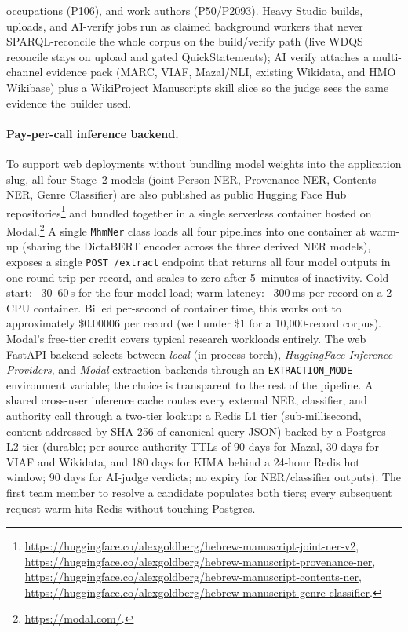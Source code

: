 \documentclass[Afour,sageh,times]{sagej}
\begin{document}
occupations (P106), and work authors (P50/P2093). Heavy Studio builds, uploads, and AI-verify jobs run as claimed background workers that never SPARQL-reconcile the whole corpus on the build/verify path (live WDQS reconcile stays on upload and gated QuickStatements); AI verify attaches a multi-channel evidence pack (MARC, VIAF, Mazal/NLI, existing Wikidata, and HMO Wikibase) plus a WikiProject Manuscripts skill slice so the judge sees the same evidence the builder used.

\paragraph{Pay-per-call inference backend.} To support web deployments without bundling model weights into the application slug, all four Stage~2 models (joint Person NER, Provenance NER, Contents NER, Genre Classifier) are also published as public Hugging Face Hub repositories\footnote{\url{https://huggingface.co/alexgoldberg/hebrew-manuscript-joint-ner-v2}, \url{https://huggingface.co/alexgoldberg/hebrew-manuscript-provenance-ner}, \url{https://huggingface.co/alexgoldberg/hebrew-manuscript-contents-ner}, \url{https://huggingface.co/alexgoldberg/hebrew-manuscript-genre-classifier}.} and bundled together in a single serverless container hosted on Modal.\footnote{\url{https://modal.com/}.} A single \texttt{MhmNer} class loads all four pipelines into one container at warm-up (sharing the DictaBERT encoder across the three derived NER models), exposes a single \texttt{POST /extract} endpoint that returns all four model outputs in one round-trip per record, and scales to zero after 5~minutes of inactivity. Cold start: ~30--60\,s for the four-model load; warm latency: ~300\,ms per record on a 2-CPU container. Billed per-second of container time, this works out to approximately \$0.00006 per record (well under \$1 for a 10{,}000-record corpus). Modal's free-tier credit covers typical research workloads entirely. The web FastAPI backend selects between \emph{local} (in-process torch), \emph{HuggingFace Inference Providers}, and \emph{Modal} extraction backends through an \texttt{EXTRACTION\_MODE} environment variable; the choice is transparent to the rest of the pipeline. A shared cross-user inference cache routes every external NER, classifier, and authority call through a two-tier lookup: a Redis L1 tier (sub-millisecond, content-addressed by SHA-256 of canonical query JSON) backed by a Postgres L2 tier (durable; per-source authority TTLs of 90 days for Mazal, 30 days for VIAF and Wikidata, and 180 days for KIMA behind a 24-hour Redis hot window; 90 days for AI-judge verdicts; no expiry for NER/classifier outputs). The first team member to resolve a candidate populates both tiers; every subsequent request warm-hits Redis without touching Postgres.
\end{document}
